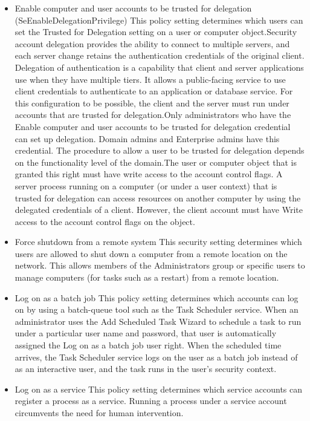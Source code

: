 \begin{itemize}
    \item Enable computer and user accounts to be trusted for delegation (SeEnableDelegationPrivilege)
This policy setting determines which users can set the Trusted for Delegation setting on a user or computer object.Security account delegation provides the ability to connect to multiple servers, and each server change retains the authentication credentials of the original client. Delegation of authentication is a capability that client and server applications use when they have multiple tiers. It allows a public-facing service to use client credentials to authenticate to an application or database service. For this configuration to be possible, the client and the server must run under accounts that are trusted for delegation.Only administrators who have the Enable computer and user accounts to be trusted for delegation credential can set up delegation. Domain admins and Enterprise admins have this credential. The procedure to allow a user to be trusted for delegation depends on the functionality level of the domain.The user or computer object that is granted this right must have write access to the account control flags. A server process running on a computer (or under a user context) that is trusted for delegation can access resources on another computer by using the delegated credentials of a client. However, the client account must have Write access to the account control flags on the object.

    \item Force shutdown from a remote system
This security setting determines which users are allowed to shut down a computer from a remote location on the network. This allows members of the Administrators group or specific users to manage computers (for tasks such as a restart) from a remote location.

    \item Log on as a batch job
This policy setting determines which accounts can log on by using a batch-queue tool such as the Task Scheduler service. When an administrator uses the Add Scheduled Task Wizard to schedule a task to run under a particular user name and password, that user is automatically assigned the Log on as a batch job user right. When the scheduled time arrives, the Task Scheduler service logs on the user as a batch job instead of as an interactive user, and the task runs in the user’s security context.

    \item Log on as a service
This policy setting determines which service accounts can register a process as a service. Running a process under a service account circumvents the need for human intervention.


\end{itemize}
